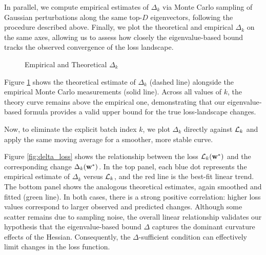 \documentclass{article}
\begin{document}
In parallel, we compute empirical estimates of $\Delta_k$ via Monte Carlo sampling of Gaussian perturbations along the same
top-$D$ eigenvectors, following the procedure described above. Finally, we plot the
theoretical and empirical $\Delta_k$ on the same axes, allowing us to assess how closely the eigenvalue-based bound tracks the observed
convergence of the loss landscape.

\begin{figure}[!htbp]
  \caption{Empirical and Theoretical $\Delta_k$}
  \label{fig:delta_eigen_comparison}
\end{figure}

Figure \ref{fig:delta_eigen_comparison} shows the theoretical estimate of $\Delta_k$ (dashed line) alongside the empirical Monte Carlo
measurements (solid line). Across all values of $k$, the theory curve remains above the empirical one, demonstrating that our
eigenvalue‐based formula provides a valid upper bound for the true loss‐landscape changes.

Now, to eliminate the explicit batch index $k$, we plot $\Delta_k$ directly against $\mathcal{L}_k$ and apply the same moving average
for a smoother, more stable curve.

Figure \ref{fig:delta_loss} shows the relationship between the loss $\mathcal{L}_k(\mathbf{w}^*)$ and the corresponding change $\Delta_k(\mathbf{w}^*)$.
In the top panel, each blue dot represents the empirical estimate of $\Delta_k$ versus $\mathcal{L}_k$, and the red line is the best-fit
linear trend. The bottom panel shows the analogous theoretical estimates, again smoothed and fitted (green line). In both cases,
there is a strong positive correlation: higher loss values correspond to larger observed and predicted changes. Although some
scatter remains due to sampling noise, the overall linear relationship validates our hypothesis that the eigenvalue-based
bound $\Delta$ captures the dominant curvature effects of the Hessian. Consequently, the $\Delta$-sufficient condition can effectively
limit changes in the loss function.
\end{document}
